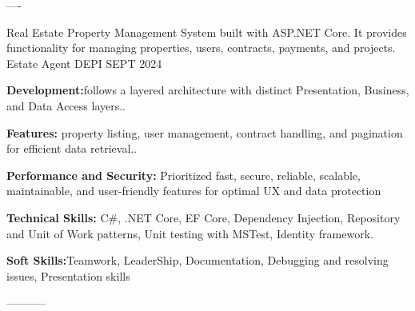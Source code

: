 \begin{cventries}
    \begin{singlespace}
----
\end{singlespace}
\cventry
    {Real Estate Property Management System built with ASP.NET Core. It provides functionality for managing properties, users, contracts, payments, and projects.
    } %
    {Estate Agent } %
    {DEPI} %
    {SEPT 2024} %
    {
      \begin{cvitems} %
        \item \textbf{Development:}{follows a layered architecture with distinct Presentation, Business, and Data Access layers..}
        \item \textbf{Features:}{ property listing, user management, contract handling, and pagination for efficient data retrieval..}
        \item \textbf{Performance and Security:}{ Prioritized fast, secure, reliable, scalable, maintainable, and user-friendly features for optimal UX and data protection}
        \item \textbf{Technical Skills:}{ C\#, .NET Core, EF Core, Dependency Injection, Repository and Unit of Work patterns, Unit testing with MSTest, Identity framework.}
        \item \textbf{Soft Skills:}{Teamwork, LeaderShip, Documentation, Debugging and resolving issues, Presentation skills}
      \end{cvitems}
    }
    
    \begin{singlespace}
-----------
\end{singlespace}


\end{cventries}
